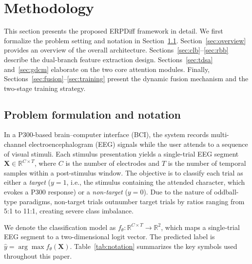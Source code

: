 
\section{Methodology}\label{sec:method}

This section presents the proposed ERPDiff framework in detail. We first formalize the problem setting and notation in Section~\ref{sec:problem}. Section~\ref{sec:overview} provides an overview of the overall architecture. Sections~\ref{sec:clb}--\ref{sec:rbb} describe the dual-branch feature extraction design. Sections~\ref{sec:tdsa} and~\ref{sec:gdcm} elaborate on the two core attention modules. Finally, Sections~\ref{sec:fusion}--\ref{sec:training} present the dynamic fusion mechanism and the two-stage training strategy.

\subsection{Problem formulation and notation}\label{sec:problem}

In a P300-based brain--computer interface (BCI), the system records multi-channel electroencephalogram (EEG) signals while the user attends to a sequence of visual stimuli. Each stimulus presentation yields a single-trial EEG segment $\mathbf{X} \in \mathbb{R}^{C \times T}$, where $C$ is the number of electrodes and $T$ is the number of temporal samples within a post-stimulus window. The objective is to classify each trial as either a \emph{target} ($y = 1$, i.e., the stimulus containing the attended character, which evokes a P300 response) or a \emph{non-target} ($y = 0$). Due to the nature of oddball-type paradigms, non-target trials outnumber target trials by ratios ranging from 5:1 to 11:1, creating severe class imbalance.

We denote the classification model as $f_\theta: \mathbb{R}^{C \times T} \rightarrow \mathbb{R}^2$, which maps a single-trial EEG segment to a two-dimensional logit vector. The predicted label is $\hat{y} = \arg\max f_\theta(\mathbf{X})$. Table~\ref{tab:notation} summarizes the key symbols used throughout this paper.

